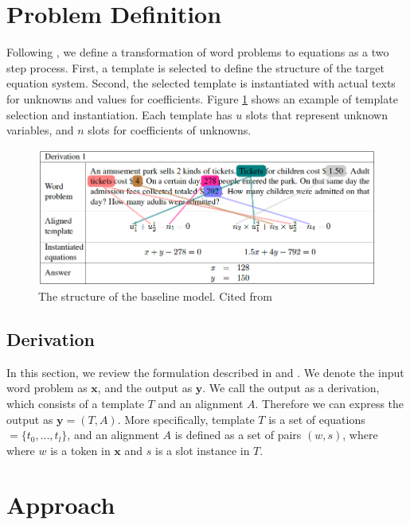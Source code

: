 \documentclass[11pt,letterpaper]{article}
\begin{document}
\section{Problem Definition}
Following \cite{Kushman2014LearningTA}, we define a transformation of word problems to equations as a two step process. First, a template is selected to define the structure of the target equation system. Second, the selected template is instantiated with actual texts for unknowns and values for coefficients. Figure \ref{template} shows an example of template selection and instantiation. Each template has $u$ slots that represent unknown variables, and $n$ slots for coefficients of unknowns.
\begin{figure}[ht]
	\centering
	\includegraphics[bb=0 0 877 353, scale=0.5]{template.png}%
    \caption{The structure of the baseline model. Cited from \cite{Kushman2014LearningTA}}
    \label{template}
\end{figure}
\subsection{Derivation}
In this section, we review the formulation described in \cite{Kushman2014LearningTA} and \cite{UpChChYi16}. We denote the input word problem as $\textbf{x}$, and the output as $\textbf{y}$. We call the output as a derivation, which consists of a template $T$ and an alignment $A$. Therefore we can express the output as $\textbf{y} = (T, A)$. More specifically, template $T$ is a set of equations $= \{t_0, ..., t_l\}$, and an alignment $A$ is defined as a set of pairs $(w, s)$, where where $w$ is a token in $\textbf{x}$ and $s$ is a slot instance in $T$.
\section{Approach}
\end{document}

